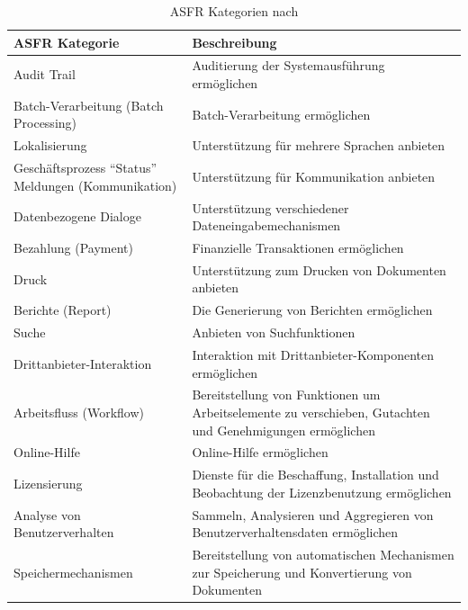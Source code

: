 \begin{table}[h] %
\caption{ASFR Kategorien nach \cite{Ros02}}
\centering
\begin{tabular}{|p{3cm}|p{5cm}|}
	\hline
	\textbf{ASFR Kategorie} & \textbf{Beschreibung} \\ %
	\hline
  	Audit Trail & Auditierung der Systemausf\"uhrung erm\"oglichen \\%
	\hline
	Batch-Verarbeitung (Batch Processing) & Batch-Verarbeitung erm\"oglichen \\
	\hline
	Lokalisierung & Unterst\"utzung f\"ur mehrere Sprachen anbieten \\
	\hline
	Gesch\"aftsprozess ``Status'' Meldungen (Kommunikation) & Unterst\"utzung f\"ur Kommunikation anbieten \\
	\hline
	Datenbezogene Dialoge & Unterst\"utzung verschiedener Dateneingabemechanismen \\
	\hline
	Bezahlung (Payment) & Finanzielle Transaktionen erm\"oglichen \\
	\hline
	Druck & Unterst\"utzung zum Drucken von Dokumenten anbieten \\
	\hline
	Berichte (Report) & Die Generierung von Berichten erm\"oglichen \\
	\hline
	Suche & Anbieten von Suchfunktionen \\
	\hline
	Drittanbieter-Interaktion & Interaktion mit Drittanbieter-Komponenten erm\"oglichen \\
	\hline
	Arbeitsfluss (Workflow) & Bereitstellung von Funktionen um Arbeitselemente zu verschieben, Gutachten und Genehmigungen erm\"oglichen\\
	\hline
	Online-Hilfe & Online-Hilfe erm\"oglichen \\
	\hline
	Lizensierung & Dienste f\"ur die Beschaffung, Installation und Beobachtung der Lizenzbenutzung erm\"oglichen \\
	\hline
	Analyse von Benutzerverhalten & Sammeln, Analysieren und Aggregieren von Benutzerverhaltensdaten erm\"oglichen \\
	\hline
	Speichermechanismen & Bereitstellung von automatischen Mechanismen zur Speicherung und Konvertierung von Dokumenten \\
	\hline
\end{tabular}
\label{tab:asfr_category_table}
\end{table}

